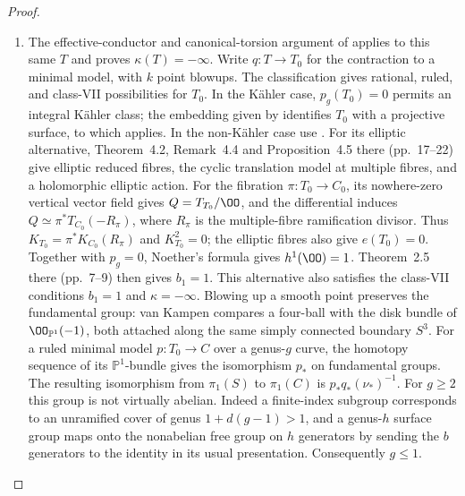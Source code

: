 \begin{proof}
\begin{enumerate}[label={$\langle1\rangle$\arabic*.},leftmargin=*]
\item The effective-conductor and canonical-torsion argument of
 applies to this same $T$ and proves
$\kappa(T)=-\infty$. Write $q:T\to T_0$ for the contraction
to a minimal model, with $k$ point blowups. The classification
gives rational, ruled, and class-VII possibilities for $T_0$.
In the K\"ahler case, $p_g(T_0)=0$ permits an integral
K\"ahler class; the embedding given by
\cite[Main Theorem, pp.~314--315]{Kodaira1954} identifies $T_0$
with a projective surface, to which
\cite[Theorem~VI.17 and Corollary~VI.18, pp.~111--112]{Beauville1978}
applies. In the non-K\"ahler case use
\cite[Theorem~5.1, p.~27]{OVV2020}. For its elliptic alternative, Theorem~4.2, Remark~4.4 and
Proposition~4.5 there (pp.~17--22) give elliptic reduced fibres,
the cyclic translation model at multiple fibres, and a
holomorphic elliptic action. For the fibration
$\pi:T_0\to C_0$, its nowhere-zero vertical vector field gives
$Q=T_{T_0}/\OO$, and the differential induces
$Q\simeq\pi^*T_{C_0}(-R_\pi)$, where $R_\pi$ is the
multiple-fibre ramification divisor. Thus
$K_{T_0}=\pi^*K_{C_0}(R_\pi)$ and $K_{T_0}^2=0$;
the elliptic fibres also give $e(T_0)=0$. Together with
$p_g=0$, Noether's formula gives $h^1(\OO)=1$.
Theorem~2.5 there (pp.~7--9) then gives $b_1=1$.
This alternative also satisfies the class-VII conditions
$b_1=1$ and $\kappa=-\infty$.
Blowing up a smooth point preserves the fundamental group:
van Kampen compares a four-ball with the disk bundle
of $\OO_{\mathbb P^1}(-1)$, both attached along the same
simply connected boundary $S^3$. For a ruled minimal model
$p:T_0\to C$ over a genus-$g$ curve, the homotopy sequence
of its $\mathbb P^1$-bundle gives the isomorphism $p_*$
on fundamental groups. The resulting isomorphism from
$\pi_1(S)$ to $\pi_1(C)$ is $p_*q_*(\nu_*)^{-1}$.
For $g\ge2$ this group is not virtually abelian. Indeed a
finite-index subgroup corresponds to an unramified cover
of genus $1+d(g-1)>1$, and a genus-$h$ surface group maps
onto the nonabelian free group on $h$ generators by sending
the $b$ generators to the identity in its usual presentation.
Consequently $g\le1$.


\end{enumerate}
\end{proof}
